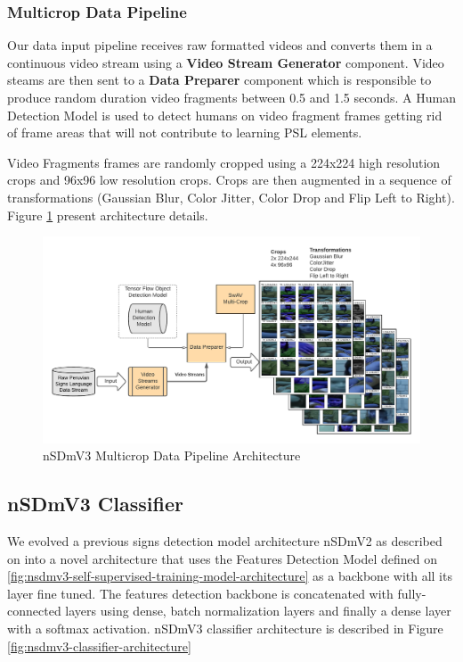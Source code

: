 \documentclass[twocolumn,conference]{article}
\begin{document}
\subsubsection{Multicrop Data Pipeline}\label{multi-crop-data-pipeline}
Our data input pipeline receives raw formatted videos and converts them in a continuous video stream using a \textbf{Video Stream Generator} component. Video steams are then sent to a \textbf{Data Preparer} component which is responsible to produce random duration video fragments between 0.5 and 1.5 seconds. A Human Detection Model is used to detect humans on video fragment frames getting rid of frame areas that will not contribute to learning PSL elements.

Video Fragments frames are randomly cropped using a 224x224 high resolution crops and 96x96 low resolution crops. Crops are then augmented in a sequence of transformations (Gaussian Blur, Color Jitter, Color Drop and Flip Left to Right).  Figure \ref{fig:nsdmv3-multicrop-data-pipeline-architecture} present architecture details.

\begin{figure}[hbt!]
\includegraphics[width=\textwidth,height=\textheight,keepaspectratio]{images/nsdmv3-self-supervised-training-data-input-architecture.png}
\caption{nSDmV3 Multicrop Data Pipeline Architecture}
\label{fig:nsdmv3-multicrop-data-pipeline-architecture}
\end{figure}

\subsection{nSDmV3 Classifier}\label{nsdmv3-classifier}
We evolved a previous signs detection model architecture nSDmV2 as described on \cite{Pereyra_2021_CVPR} into a novel architecture that uses the Features Detection Model defined on \ref{fig:nsdmv3-self-supervised-training-model-architecture} as a backbone with all its layer fine tuned. The features detection backbone is concatenated with fully-connected layers using dense, batch normalization layers and finally a dense layer with a softmax activation. nSDmV3 classifier architecture is described in Figure \ref{fig:nsdmv3-classifier-architecture} 
\end{document}
